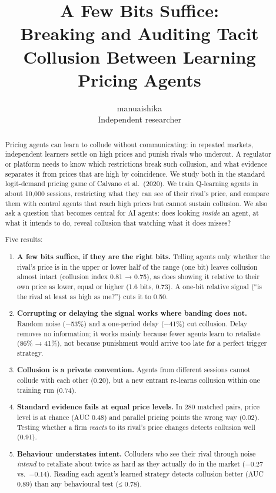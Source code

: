 \documentclass[11pt,a4paper]{article}
\title{A Few Bits Suffice:\\[2pt]\large Breaking and Auditing Tacit Collusion Between Learning Pricing Agents}
\author{manuaishika\\ \small Independent researcher}
\date{}
\providecommand{\tightlist}{\setlength{\itemsep}{1pt}\setlength{\parskip}{0pt}}
\begin{document}
\maketitle

\begin{abstract}
Pricing agents can learn to collude without communicating: in repeated markets, independent learners settle on high prices and punish rivals who undercut. A regulator or platform needs to know which restrictions break such collusion, and what evidence separates it from prices that are high by coincidence. We study both in the standard logit-demand pricing game of Calvano et al.~(2020). We train Q-learning agents in about 10,000 sessions, restricting what they can see of their rival's price, and compare them with control agents that reach high prices but cannot sustain collusion. We also ask a question that becomes central for AI agents: does looking \emph{inside} an agent, at what it intends to do, reveal collusion that watching what it does misses?

Five results:

\begin{enumerate}
\def\labelenumi{\arabic{enumi}.}
\tightlist
\item
  \textbf{A few bits suffice, if they are the right bits.} Telling agents only whether the rival's price is in the upper or lower half of the range (one bit) leaves collusion almost intact (collusion index 0.81 → 0.75), as does showing it relative to their own price as lower, equal or higher (1.6 bits, 0.73). A one-bit relative signal (``is the rival at least as high as me?'') cuts it to 0.50.
\item
  \textbf{Corrupting or delaying the signal works where banding does not.} Random noise (−53\%) and a one-period delay (−41\%) cut collusion. Delay removes no information; it works mainly because fewer agents learn to retaliate (86\% → 41\%), not because punishment would arrive too late for a perfect trigger strategy.
\item
  \textbf{Collusion is a private convention.} Agents from different sessions cannot collude with each other (0.20), but a new entrant re-learns collusion within one training run (0.74).
\item
  \textbf{Standard evidence fails at equal price levels.} In 280 matched pairs, price level is at chance (AUC 0.48) and parallel pricing points the wrong way (0.02). Testing whether a firm \emph{reacts} to its rival's price changes detects collusion well (0.91).
\item
  \textbf{Behaviour understates intent.} Colluders who see their rival through noise \emph{intend} to retaliate about twice as hard as they actually do in the market (−0.27 vs.~−0.14). Reading each agent's learned strategy detects collusion better (AUC 0.89) than any behavioural test (≤ 0.78).
\end{enumerate}


\end{abstract}
\end{document}
